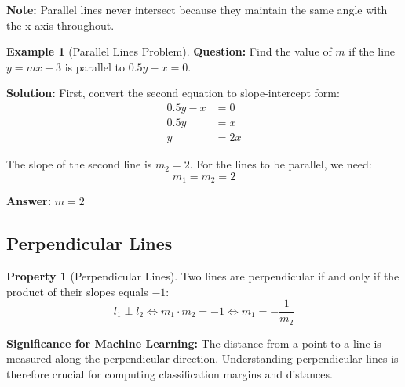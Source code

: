 \documentclass[12pt,a4paper]{article}
\theoremstyle{directpoint}
\theoremstyle{definition}
\newtheorem{example}{Example}[section]
\newtheorem{property}{Property}[section]
\begin{document}
\textbf{Note:} Parallel lines never intersect because they maintain the same angle with the x-axis throughout.

\begin{example}[Parallel Lines Problem]
\textbf{Question:} Find the value of $m$ if the line $y = mx + 3$ is parallel to $0.5y - x = 0$.

\textbf{Solution:} First, convert the second equation to slope-intercept form:
\begin{align}
0.5y - x &= 0 \\
0.5y &= x \\
y &= 2x
\end{align}

The slope of the second line is $m_2 = 2$. For the lines to be parallel, we need:
\begin{equation}
m_1 = m_2 = 2
\end{equation}

\textbf{Answer:} $m = 2$
\end{example}

\subsection{Perpendicular Lines}

\begin{property}[Perpendicular Lines]
Two lines are perpendicular if and only if the product of their slopes equals $-1$:
\begin{equation}
l_1 \perp l_2 \iff m_1 \cdot m_2 = -1 \iff m_1 = -\frac{1}{m_2}
\end{equation}
\end{property}

\textbf{Significance for Machine Learning:} The distance from a point to a line is measured along the perpendicular direction. Understanding perpendicular lines is therefore crucial for computing classification margins and distances.
\end{document}
